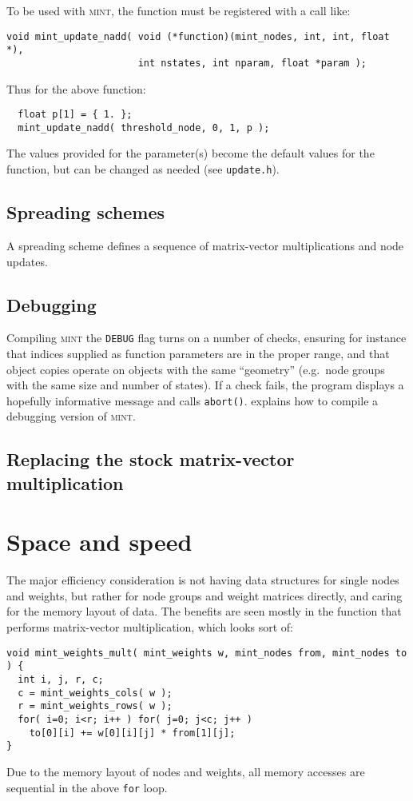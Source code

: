 \documentclass[11pt,letterpaper]{memoir}
\newcommand{\mint}{{\scshape\sffamily mint}\xspace}
\begin{document}
To be used with \mint, the function must be registered with a call
like:
\begin{lstlisting}
void mint_update_nadd( void (*function)(mint_nodes, int, int, float *),
                       int nstates, int nparam, float *param );
\end{lstlisting}
Thus for the above function:
\begin{lstlisting}
  float p[1] = { 1. };
  mint_update_nadd( threshold_node, 0, 1, p );
\end{lstlisting}
The values provided for the parameter(s) become the default values for
the function, but can be changed as needed (see \lstinline{update.h}).

\section{Spreading schemes}
\label{sec:spreading}

A spreading scheme defines a sequence of matrix-vector multiplications
and node updates.


\section{Debugging}
\label{sec:debugging}

Compiling \mint the \lstinline{DEBUG} flag turns on a number of
checks, ensuring for instance that indices supplied as function
parameters are in the proper range, and that object copies operate on
objects with the same ``geometry'' (e.g.\ node groups with the same
size and number of states).  If a check fails, the program displays a
hopefully informative message and calls \lstinline{abort()}.
 explains how to compile a debugging version of
\mint.


\section{Replacing the stock matrix-vector multiplication}
\label{sec:mvm}

\chapter{Space and speed}
\label{chap:details}

The major efficiency consideration is not having data structures for
single nodes and weights, but rather for node groups and weight
matrices directly, and caring for the memory layout of data. The
benefits are seen mostly in the function that performs matrix-vector
multiplication, which looks sort of:
\begin{lstlisting}
void mint_weights_mult( mint_weights w, mint_nodes from, mint_nodes to ) {
  int i, j, r, c;
  c = mint_weights_cols( w );
  r = mint_weights_rows( w );
  for( i=0; i<r; i++ ) for( j=0; j<c; j++ ) 
    to[0][i] += w[0][i][j] * from[1][j];
}  
\end{lstlisting}
Due to the memory layout of nodes and weights, all memory accesses are
sequential in the above \lstinline{for} loop.
\end{document}
